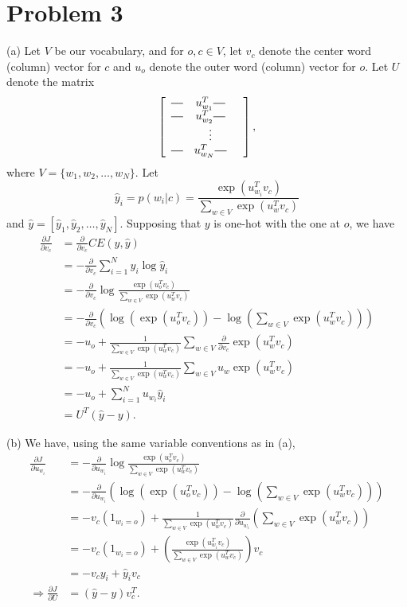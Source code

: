 \documentclass{article}
\newcommand*{\horzbar}{\rule[.5ex]{2.5ex}{0.5pt}}
\newcommand{\pd}[2]{\frac{\partial #1}{\partial #2}}
\begin{document}
\section{Problem 3}
(a) Let $V$ be our vocabulary, and for $o, c \in V$, let $v_c$ denote the center word (column) vector for $c$ and $u_o$ denote the outer word (column) vector for $o$. Let $U$ denote the matrix
$$
\left[
\begin{array}{ccc}
\horzbar & u_{w_1}^T \horzbar \\
\horzbar & u_{w_2}^T \horzbar \\
& \vdots & \\
\horzbar & u_{w_N}^T \horzbar \\
\end{array}
\right],
$$
where $V = \{w_1, w_2, \dots, w_N\}$. Let 
$$\hat{y}_i = p(w_i | c) = \frac{\exp(u_{w_i}^Tv_c)}{\sum_{w \in V}\exp(u_w^Tv_c)}$$
and $\hat{y} = [\hat{y}_1, \hat{y}_2, \dots, \hat{y}_N].$ Supposing that $y$ is one-hot with the one at $o$, we have
\begin{align*}
\pd{J}{v_c} &= \pd{}{v_c} CE(y, \hat{y})\\
&= -\pd{}{v_c} \sum_{i=1}^N y_i \log \hat{y}_i \\
&= -\pd{}{v_c} \log \frac{\exp(u_o^Tv_c)}{\sum_{w\in V} \exp\left(u_w^Tv_c\right)}\\
&= -\pd{}{v_c} \left( \log\left(\exp(u_o^Tv_c)\right) - \log\left(\sum_{w\in V} \exp\left(u_w^Tv_c\right)\right)\right)\\
&= -u_o + \frac{1}{\sum_{w\in V}\exp( u_w^Tv_c)} \sum_{w\in V}\pd{}{v_c}\exp\left(u_w^Tv_c\right)\\
&= -u_o + \frac{1}{\sum_{w\in V}\exp( u_w^Tv_c)} \sum_{w\in V}u_w\exp\left(u_w^Tv_c\right)\\
&= -u_o + \sum_{i=1}^N u_{w_i}\hat{y}_i\\
&= U^T\left(\hat{y} - y\right).
\end{align*}

(b) We have, using the same variable conventions as in (a),
\begin{align*}
\pd{J}{u_{w_i}} &= -\pd{}{u_{w_i}} \log \frac{\exp(u_o^Tv_c)}{\sum_{w\in V} \exp\left(u_w^Tv_c\right)}\\
&= -\pd{}{u_{w_i}} \left( \log\left(\exp(u_o^Tv_c)\right) - \log\left(\sum_{w\in V} \exp\left(u_w^Tv_c\right)\right)\right)\\
&= -v_c(1_{w_i = o}) + \frac{1}{\sum_{w\in V}\exp( u_w^Tv_c)} \pd{}{u_{w_i}} \left(\sum_{w \in V}\exp\left(u_w^Tv_c\right) \right)\\
&= -v_c(1_{w_i = o}) + \left(\frac{\exp\left(u_{w_i}^Tv_c\right)}{\sum_{w\in V}\exp( u_w^Tv_c)} \right)v_c\\
&= -v_cy_i + \hat{y}_i v_c\\
\Rightarrow \pd{J}{U} &= (\hat{y} - y)v_c^T.
\end{align*}
\end{document}
